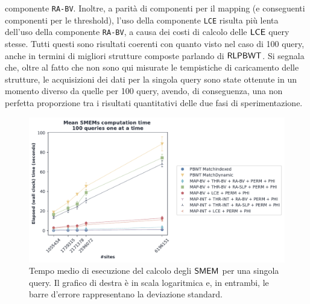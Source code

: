 componente \texttt{RA-BV}. Inoltre, a parità di componenti per il mapping (e
conseguenti componenti per le threshold), l'uso della componente \texttt{LCE}
risulta più lenta dell'uso della componente \texttt{RA-BV}, a causa dei costi di
calcolo delle $\mbox{\rm {\sf LCE}}$ query stesse. Tutti questi sono risultati coerenti
con quanto visto nel caso di 100 query, anche in termini di migliori strutture
composte parlando di $\mbox{\rm {\sf RLPBWT}}$. Si segnala che, oltre al fatto che non
sono qui misurate le tempistiche di caricamento delle strutture, le acquisizioni
dei dati 
per la singola query sono state ottenute in un momento diverso da quelle per 100
query, avendo, di conseguenza, una non perfetta proporzione tra i risultati
quantitativi delle due fasi di sperimentazione.
\begin{figure}
  \centering
  \includegraphics[width=\textwidth]{img/exe_time_single_paper.pdf}
  \caption{Tempo medio di esecuzione del calcolo degli $\mbox{\rm {\sf SMEM}}$ per una singola
    query. Il grafico di destra è in scala logaritmica e, in entrambi, le
    barre d'errore rappresentano la deviazione standard.}
  \label{fig:smemsinglechr}
\end{figure}

